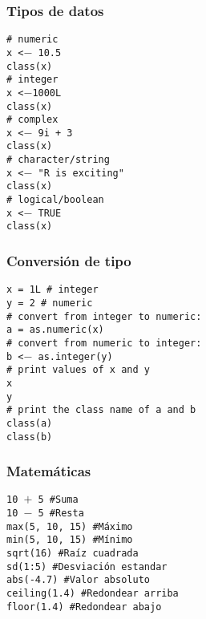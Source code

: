 \documentclass[12pt]{beamer}
\begin{document}
	\begin{frame}
		\frametitle{Tipos de datos}
		\texttt{\# numeric}\\
		\texttt{x <$-$ 10.5}\\
		\texttt{class(x)}\\
		\texttt{\# integer}\\
		\texttt{x <$- $1000L}\\
		\texttt{class(x)}\\
		\texttt{\# complex}\\
		\texttt{x <$-$ 9i + 3}\\
		\texttt{class(x)}\\
		\texttt{\# character/string}\\
		\texttt{x <$-$ "R is exciting"}\\
		\texttt{class(x)}\\
		\texttt{\# logical/boolean}\\
		\texttt{x <$-$ TRUE}\\
		\texttt{class(x)}		
		
	\end{frame}


	\begin{frame}
	\frametitle{Conversión de tipo}
	
	\texttt{x = 1L \# integer}\\
	\texttt{y = 2 \# numeric}\\
	\texttt{\# convert from integer to numeric:}\\
	\texttt{a = as.numeric(x)}\\
	\texttt{\# convert from numeric to integer:}\\
	\texttt{b <$-$ as.integer(y)}\\
	\texttt{\# print values of x and y}\\
	\texttt{x}\\
	\texttt{y}\\
	\texttt{\# print the class name of a and b}\\
	\texttt{class(a)}\\
	\texttt{class(b)}
	
	\end{frame}


	\begin{frame}
		\frametitle{Matemáticas}
		\texttt{10 $+$ 5 \#Suma}\\
		\texttt{10 $-$ 5 \#Resta}\\
		\texttt{max(5, 10, 15) \#Máximo}\\
		\texttt{min(5, 10, 15) \#Mínimo}\\
		\texttt{sqrt(16) \#Raíz cuadrada}\\
		\texttt{sd(1:5) \#Desviación estandar}\\
		\texttt{abs(-4.7) \#Valor absoluto}\\
		\texttt{ceiling(1.4) \#Redondear arriba}\\
		\texttt{floor(1.4) \#Redondear abajo}
	\end{frame}
\end{document}
